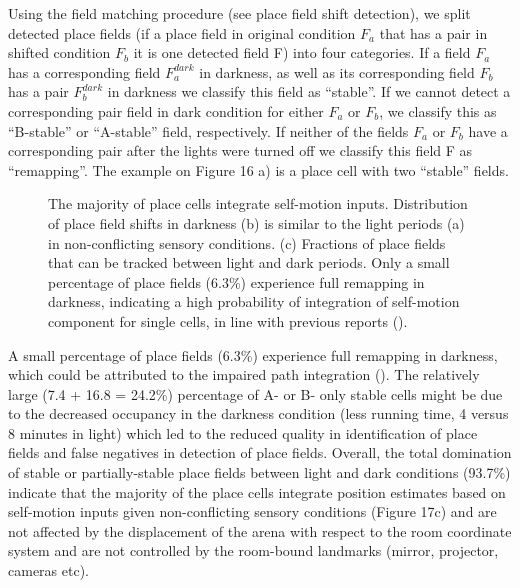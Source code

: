 Using the field matching procedure (see place field shift detection), we split detected place fields (if a place field in original condition $F_a$ that has a pair in shifted condition $F_b$ it is one detected field F) into four categories. If a field $F_a$ has a corresponding field $F_a^{dark}$ in darkness, as well as its corresponding field $F_b$ has a pair $F_b^{dark}$ in darkness we classify this field as “stable”. If we cannot detect a corresponding pair field in dark condition for either $F_a$ or $F_b$, we classify this as “B-stable” or “A-stable” field, respectively. If neither of the fields $F_a$ or $F_b$ have a corresponding pair after the lights were turned off we classify this field F as “remapping”. The example on Figure 16 a) is a place cell with two “stable” fields.

\begin{figure}
\captionsetup{format=plain}
\caption[Widespread integration of self-motion inputs]{
The majority of place cells integrate self-motion inputs. Distribution of place field shifts in darkness (b) is similar to the light periods (a) in non-conflicting sensory conditions. (c) Fractions of place fields that can be tracked between light and dark periods. Only a small percentage of place fields (6.3\%) experience full remapping in darkness, indicating a high probability of integration of self-motion component for single cells, in line with previous reports (\cite{Allen6245}).
}
\label{fig:F17_integration_of_sm_inputs}
\end{figure}

A small percentage of place fields (6.3\%) experience full remapping in darkness, which could be attributed to the impaired path integration (\cite{Allen6245}). The relatively large (7.4 + 16.8 = 24.2\%) percentage of A- or B- only stable cells might be due to the decreased occupancy in the darkness condition (less running time, 4 versus 8 minutes in light) which led to the reduced quality in identification of place fields and false negatives in detection of place fields. Overall, the total domination of stable or partially-stable place fields between light and dark conditions (93.7\%) indicate that the majority of the place cells integrate position estimates based on self-motion inputs given non-conflicting sensory conditions (Figure 17c) and are not affected by the displacement of the arena with respect to the room coordinate system and are not controlled by the room-bound landmarks (mirror, projector, cameras etc).


